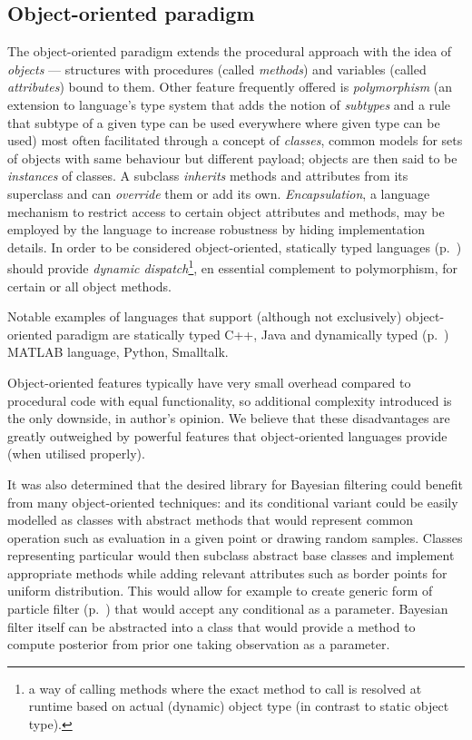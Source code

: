 \subsection{Object-oriented paradigm} \label{sec:OOP}

The object-oriented paradigm extends the procedural approach with the idea of \emph{objects} ---
structures with procedures
(called \emph{methods}) and variables (called \emph{attributes}) bound to them. Other
feature frequently offered is \emph{polymorphism} (an extension to language's type
system that adds the notion of \emph{subtypes} and a rule that subtype of a given type can
be used everywhere where given type can be used) most often facilitated through a concept of
\emph{classes}, common models for sets of objects with same behaviour but different
payload; objects are then said to be \emph{instances} of classes. A subclass \emph{inherits}
methods and attributes from its superclass and can \emph{override} them or add its own.
\emph{Encapsulation}, a language mechanism to restrict access to certain object attributes and
methods, may be employed by the language to increase robustness by hiding implementation
details. In order to be considered object-oriented, statically typed languages
(p.~\pageref{desc:StaticTyping}) should provide \emph{dynamic dispatch}\footnote{a way of
calling methods where the exact method to call is resolved at runtime based on actual (dynamic)
object type (in contrast to static object type).}, en essential complement to polymorphism, for
certain or all object methods.

Notable examples of languages that support (although not exclusively) object-oriented
paradigm are statically typed C++, Java and dynamically typed (p.~\pageref{desc:DynamicTyping})
MATLAB language, Python, Smalltalk.

Object-oriented features typically have very small overhead compared to procedural code with
equal functionality, so additional complexity introduced is the only downside, in author's
opinion. We believe that these disadvantages are greatly outweighed by powerful features
that object-oriented languages provide (when utilised properly).

It was also determined that
the desired library for Bayesian filtering could benefit from many object-oriented techniques: {\pdf}
and its conditional variant could be easily modelled as classes with abstract methods that
would represent common operation such as evaluation in a given point or drawing random samples.
Classes representing particular {\pdfs} would then subclass abstract base classes and implement
appropriate methods while adding relevant attributes such as border points for uniform
distribution. This would allow for example to create generic form of particle filter
(p.~\pageref{sec:ParticleFilter}) that would accept any conditional {\pdf} as a parameter.
Bayesian filter itself can be abstracted into a class that would provide a method to compute
posterior {\pdf} from prior one taking observation as a parameter.

